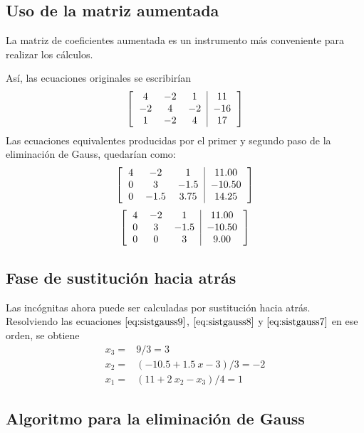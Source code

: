 \subsection*{Uso de la matriz aumentada}
La matriz de coeficientes aumentada es un instrumento más conveniente para realizar los cálculos. 
\par
Así, las ecuaciones originales se escribirían
\[ \left[\begin{tabular}{c c c | c }
$4$ & $-2$ & $1$ & $11$	 \\
$-2$ & $4$ & $-2$ & $-16$ \\
$1$ & $-2$ & $4$ & $17$
\end{tabular} \right] \]
Las ecuaciones equivalentes producidas por el primer y segundo paso de la eliminación de Gauss, quedarían como:
\[ \left[\begin{tabular}{c c c | c }
$4$ & $-2$ & $1$ & $11.00$ \\
$0$ & $3$ & $-1.5$ & $-10.50$ \\
$0$ & $-1.5$ & $3.75$ & $14.25$
\end{tabular} \right] \]
\[ \left[\begin{tabular}{c c c | c }
$4$ & $-2$ & $1$ & $11.00$ \\
$0$ & $3$ & $-1.5$ & $-10.50$ \\
$0$ & $0$ & $3$ & $9.00$
\end{tabular} \right] \]
\subsection{Fase de sustitución hacia atrás}
Las incógnitas ahora puede ser calculadas por sustitución hacia atrás. Resolviendo las ecuaciones $\eqref{eq:sistgauss9}$, $\eqref{eq:sistgauss8}$ y $\eqref{eq:sistgauss7}$ en ese orden, se obtiene
\[ \begin{split}
x_{3} =& 9/3 = 3 \\
x_{2} =& (-10.5 + 1.5 \: x-{3})/3 = -2 \\
x_{1} =& (11 + 2 \: x_{2} - x_{3})/4 = 1
\end{split} \]
\subsection{Algoritmo para la eliminación de Gauss}
